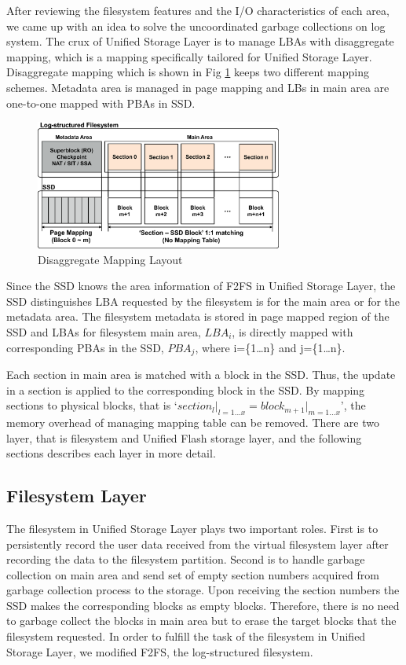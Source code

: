 \documentclass[letterpaper,twocolumn,10pt]{article}
\begin{document}
After reviewing the filesystem features and the I/O characteristics of each area, we came up with an idea to solve the uncoordinated garbage collections on log system. The crux of Unified Storage Layer is to manage LBAs with disaggregate mapping, which is a mapping specifically tailored for Unified Storage Layer. Disaggregate mapping which is shown in Fig \ref{fig:da_mapping_layout} keeps two different mapping schemes. Metadata area is managed in page mapping and LBs in main area are one-to-one mapped with PBAs in SSD.


\begin{figure}[h]
\begin{center}
\includegraphics[width=3.2in]{./figure/usl_layout}
\caption{Disaggregate Mapping Layout}
\label{fig:da_mapping_layout}
\end{center}
\end{figure}


Since the SSD knows the area information of F2FS in Unified Storage Layer, the SSD distinguishes LBA requested by the filesystem is for the main area or for the metadata area. The filesystem metadata is stored in page mapped region of the SSD and LBAs for filesystem main area, $LBA_i$, is directly mapped with corresponding PBAs in the SSD, $PBA_j$, where i=\{1…n\} and j=\{1…n\}.

Each section in main area is matched with a block in the SSD. Thus, the update in a section is applied to the corresponding block in the SSD. By mapping sections to physical blocks, that is `$section_l\big|_{l=1...x}=block_{m+1}\big|_{m=1...x}$', the memory overhead of managing mapping table can be removed. There are two layer, that is filesystem and Unified Flash storage layer, and the following sections describes each layer in more detail.

\subsection{Filesystem Layer}
\label{subsec:fs_layer}

The filesystem in Unified Storage Layer plays two important roles. First is to persistently record the user data received from the virtual filesystem layer after recording the data to the filesystem partition. Second is to handle garbage collection on main area and send set of empty section numbers acquired from garbage collection process to the storage. Upon receiving the section numbers the SSD makes the corresponding blocks as empty blocks. Therefore, there is no need to garbage collect the blocks in main area but to erase the target blocks that the filesystem requested. 
In order to fulfill the task of the filesystem in Unified Storage Layer, we modified F2FS, the log-structured filesystem. 
\end{document}
